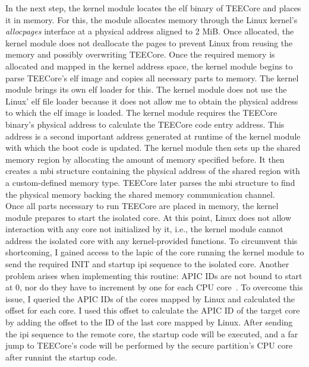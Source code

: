 In the next step, the kernel module locates the \gls{elf} binary of TEECore
and places it in memory. For this, the module allocates memory through the Linux
kernel's \textit{allocpages} interface at a physical address aligned to 2 MiB.
Once allocated, the kernel module does not deallocate the pages to prevent Linux
from reusing the memory and possibly overwriting TEECore. Once the required
memory is allocated and mapped in the kernel address space, the kernel module
begins to parse TEECore's \gls{elf} image and copies all necessary
parts to memory. The kernel module brings its own \gls{elf} loader for this. The
kernel module does not use the Linux' \gls{elf} file loader because it does not
allow me to obtain the physical address to which the \gls{elf} image is
loaded. The kernel module requires the TEECore binary's physical address to
calculate the TEECore code entry address. This address is a second important
address generated at runtime of the kernel module with which the boot code is
updated. The kernel module then sets up the shared memory region by allocating
the amount of memory specified before. It then creates a \gls{mbi} structure
containing the physical address of the shared region with a custom-defined
memory type. TEECore later parses the \gls{mbi} structure to find the physical
memory backing the shared memory communication channel.\\

Once all parts necessary to run TEECore are placed in memory, the kernel module
prepares to start the isolated core. At this point, Linux does not allow
interaction with any core not initialized by it, i.e., the kernel module cannot
address the isolated core with any kernel-provided functions. To circumvent this
shortcoming, I gained access to the \gls{lapic} of the core running the kernel
module to send the required INIT and startup \gls{ipi} sequence to the isolated
core. Another problem arises when implementing this routine: APIC IDs are not
bound to start at 0, nor do they have to increment by one for each CPU
core~\cite{intel_sdm}. To overcome this issue, I queried the APIC IDs of the
cores mapped by Linux and calculated the offset for each core. I used this
offset to calculate the APIC ID of the target core by adding the offset to the
ID of the last core mapped by Linux. After sending the \gls{ipi} sequence to the
remote core, the startup code will be executed, and a far jump to TEECore's code
will be performed by the secure partition's CPU core after runnint the startup
code.\\

